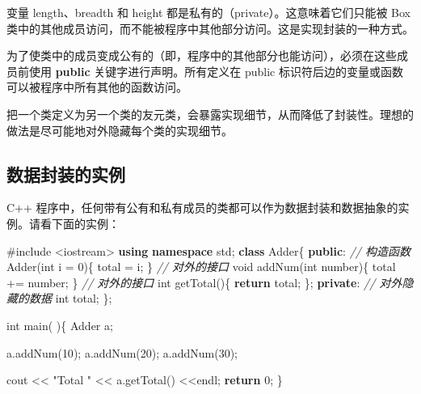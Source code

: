 \documentclass[
]{article}
\newenvironment{Shaded}{}{}
\newcommand{\CommentTok}[1]{\textcolor[rgb]{0.38,0.63,0.69}{\textit{#1}}}
\newcommand{\ControlFlowTok}[1]{\textcolor[rgb]{0.00,0.44,0.13}{\textbf{#1}}}
\newcommand{\DataTypeTok}[1]{\textcolor[rgb]{0.56,0.13,0.00}{#1}}
\newcommand{\DecValTok}[1]{\textcolor[rgb]{0.25,0.63,0.44}{#1}}
\newcommand{\ImportTok}[1]{#1}
\newcommand{\KeywordTok}[1]{\textcolor[rgb]{0.00,0.44,0.13}{\textbf{#1}}}
\newcommand{\NormalTok}[1]{#1}
\newcommand{\OperatorTok}[1]{\textcolor[rgb]{0.40,0.40,0.40}{#1}}
\newcommand{\PreprocessorTok}[1]{\textcolor[rgb]{0.74,0.48,0.00}{#1}}
\newcommand{\StringTok}[1]{\textcolor[rgb]{0.25,0.44,0.63}{#1}}
\begin{document}
变量 length、breadth 和 height 都是私有的（private）。这意味着它们只能被
Box
类中的其他成员访问，而不能被程序中其他部分访问。这是实现封装的一种方式。

为了使类中的成员变成公有的（即，程序中的其他部分也能访问），必须在这些成员前使用
\textbf{public} 关键字进行声明。所有定义在 public
标识符后边的变量或函数可以被程序中所有其他的函数访问。

把一个类定义为另一个类的友元类，会暴露实现细节，从而降低了封装性。理想的做法是尽可能地对外隐藏每个类的实现细节。

\hypertarget{ux6570ux636eux5c01ux88c5ux7684ux5b9eux4f8b}{%
\subsection{数据封装的实例}\label{ux6570ux636eux5c01ux88c5ux7684ux5b9eux4f8b}}

C++
程序中，任何带有公有和私有成员的类都可以作为数据封装和数据抽象的实例。请看下面的实例：

\begin{Shaded}
\begin{Highlighting}[]
\PreprocessorTok{\#include }\ImportTok{\textless{}iostream\textgreater{}}
\KeywordTok{using} \KeywordTok{namespace}\NormalTok{ std}\OperatorTok{;}
\KeywordTok{class}\NormalTok{ Adder}\OperatorTok{\{}
   \KeywordTok{public}\OperatorTok{:}
      \CommentTok{// 构造函数}
\NormalTok{      Adder}\OperatorTok{(}\DataTypeTok{int}\NormalTok{ i }\OperatorTok{=} \DecValTok{0}\OperatorTok{)\{}
\NormalTok{        total }\OperatorTok{=}\NormalTok{ i}\OperatorTok{;}
      \OperatorTok{\}}
      \CommentTok{// 对外的接口}
      \DataTypeTok{void}\NormalTok{ addNum}\OperatorTok{(}\DataTypeTok{int}\NormalTok{ number}\OperatorTok{)\{}
\NormalTok{          total }\OperatorTok{+=}\NormalTok{ number}\OperatorTok{;}
      \OperatorTok{\}}
      \CommentTok{// 对外的接口}
      \DataTypeTok{int}\NormalTok{ getTotal}\OperatorTok{()\{}
          \ControlFlowTok{return}\NormalTok{ total}\OperatorTok{;}
      \OperatorTok{\};}
   \KeywordTok{private}\OperatorTok{:}
      \CommentTok{// 对外隐藏的数据}
      \DataTypeTok{int}\NormalTok{ total}\OperatorTok{;}
\OperatorTok{\};}

\DataTypeTok{int}\NormalTok{ main}\OperatorTok{(} \OperatorTok{)\{}
\NormalTok{   Adder a}\OperatorTok{;}
   
\NormalTok{   a}\OperatorTok{.}\NormalTok{addNum}\OperatorTok{(}\DecValTok{10}\OperatorTok{);}
\NormalTok{   a}\OperatorTok{.}\NormalTok{addNum}\OperatorTok{(}\DecValTok{20}\OperatorTok{);}
\NormalTok{   a}\OperatorTok{.}\NormalTok{addNum}\OperatorTok{(}\DecValTok{30}\OperatorTok{);}

\NormalTok{   cout }\OperatorTok{\textless{}\textless{}} \StringTok{"Total "} \OperatorTok{\textless{}\textless{}}\NormalTok{ a}\OperatorTok{.}\NormalTok{getTotal}\OperatorTok{()} \OperatorTok{\textless{}\textless{}}\NormalTok{endl}\OperatorTok{;}
   \ControlFlowTok{return} \DecValTok{0}\OperatorTok{;}
\OperatorTok{\}}
\end{Highlighting}
\end{Shaded}
\end{document}
